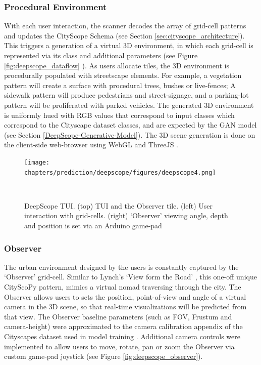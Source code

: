 {{        \subsubsection{Procedural Environment}
        {
            With each user interaction, the scanner decodes the array of grid-cell patterns and updates the CityScope Schema (see Section \eqref{sec:cityscope_architecture}). This triggers a generation of a virtual 3D environment, in which each grid-cell is represented via its class and additional parameters (see Figure
            \eqref{fig:deepscope_dataflow}
            ). As users allocate tiles, the 3D environment is procedurally populated with streetscape elements. For example, a vegetation pattern will create a surface with procedural trees, bushes or live-fences; A sidewalk pattern will produce pedestrians and street-signage, and a parking-lot pattern will be proliferated with parked vehicles. The generated 3D environment is uniformly hued with RGB values that correspond to input classes which correspond to the Cityscape dataset classes, and are expected by the GAN model (see Section \eqref{DeepScope-Generative-Model}). The 3D scene generation is done on the client-side web-browser using WebGL and ThreeJS \cite{mrdoob_2019}.
        }


        \begin{figure}[!htb]
            \centering
            \texttt{[image: chapters/prediction/deepscope/figures/deepscope4.png]}
            \caption{DeepScope TUI. (top) TUI and the Observer tile. (left) User interaction with grid-cells. (right) `Observer' viewing angle, depth and position is set via an Arduino game-pad}~\label{fig:deepscope_observer}
        \end{figure}


        \subsubsection{Observer}\label{observer}
        {
            The urban environment designed by the users is constantly captured by the `Observer' grid-cell. Similar to Lynch's `View form the Road' \cite{appleyard1964view}, this one-off unique CityScoPy pattern, mimics a virtual nomad traversing through the city. The Observer allows users to sets the position, point-of-view and angle of a virtual camera in the 3D scene, so that real-time visualizations will be predicted from that view. The Observer baseline parameters (such as FOV, Frustum and camera-height) were approximated to the camera calibration appendix of the Cityscapes dataset used in model training \cite{Cordts2016}. Additional camera controls were implemented to allow users to move, rotate, pan or zoom the Observer via custom game-pad joystick (see Figure \eqref{fig:deepscope_observer}).
        }

}}

